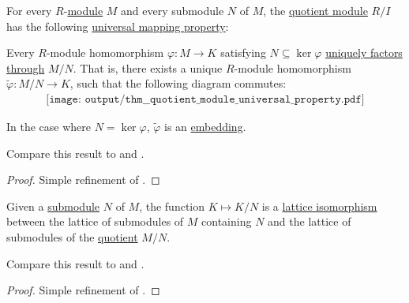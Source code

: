 \begin{theorem}\label{thm:quotient_module_universal_property}
  For every \( R \)-\hyperref[def:module]{module} \( M \) and every submodule \( N \) of \( M \), the \hyperref[def:module/quotient]{quotient module} \( R / I \) has the following \hyperref[rem:universal_mapping_property]{universal mapping property}:
  \begin{displayquote}
    Every \( R \)-module homomorphism \( \varphi: M \to K \) satisfying \( N \subseteq \ker \varphi \) \hyperref[def:factors_through]{uniquely factors through} \( M / N \). That is, there exists a unique \( R \)-module homomorphism \( \widetilde{\varphi}: M / N \to K \), such that the following diagram commutes:
    \begin{equation}\label{eq:thm:quotient_module_universal_property/diagram}
      \begin{aligned}
        \texttt{[image: output/thm\_\_quotient\_module\_universal\_property.pdf]}
      \end{aligned}
    \end{equation}

    In the case where \( N = \ker \varphi \), \( \widetilde{\varphi} \) is an \hyperref[def:first_order_homomorphism_invertibility/embedding]{embedding}.
  \end{displayquote}

  Compare this result to  and .
\end{theorem}
\begin{proof}
  Simple refinement of .
\end{proof}

\begin{theorem}\label{thm:quotient_submodule_lattice_theorem}
  Given a \hyperref[def:module/submodel]{submodule} \( N \) of \( M \), the function \( K \mapsto K / N \) is a \hyperref[def:semilattice/homomorphism]{lattice isomorphism} between the lattice of submodules of \( M \) containing \( N \) and the lattice of submodules of the \hyperref[def:module/quotient]{quotient} \( M / N \).

  Compare this result to  and .
\end{theorem}
\begin{proof}
  Simple refinement of .
\end{proof}

